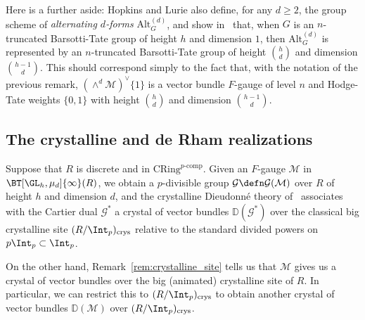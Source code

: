 \documentclass[10pt]{amsart}
\begin{document}
\begin{remark}
Here is a further aside: Hopkins and Lurie also define, for any $d\ge 2$, the group scheme of \emph{alternating $d$-forms} $\mathrm{Alt}^{(d)}_G$, and show in~\cite[Theorem 3.5.1]{lurie_hopkins} that, when $G$ is an $n$-truncated Barsotti-Tate group of height $h$ and dimension $1$, then $\mathrm{Alt}^{(d)}_G$ is represented by an $n$-truncated Barsotti-Tate group of height $\binom{h}{d}$ and dimension $\binom{h-1}{d}$. This should correspond simply to the fact that, with the notation of the previous remark, $(\wedge^d \mathcal{M})^\vee\{1\}$ is a vector bundle $F$-gauge of level $n$ and Hodge-Tate weights $\{0,1\}$ with height $\binom{h}{d}$ and dimension $\binom{h-1}{d}$.
\end{remark}   

\subsection{The crystalline and de Rham realizations}
\label{subsec:crystalline_comparison}

Suppose that $R$ is discrete and in $\mathrm{CRing}^{p\text{-comp}}$. Given an $F$-gauge $\mathcal{M}$ in $\BT[\GL_h,\mu_d]{\infty}(R)$, we obtain a $p$-divisible group $\mathcal{G}\defn \mathcal{G}(\mathcal{M})$ over $R$ of height $h$ and dimension $d$, and the crystalline Dieudonn\'e theory of~\cite{bbm:cris_ii} associates with the Cartier dual $\mathcal{G}^*$ a crystal of vector bundles $\mathbb{D}(\mathcal{G}^*)$ over the classical big crystalline site $(R/\Int_p)_{\mathrm{crys}}$ relative to the standard divided powers on $p\Int_p\subset\Int_p$. 

On the other hand, Remark~\ref{rem:crystalline_site} tells us that $\mathcal{M}$ gives us a crystal of vector bundles over the big (animated) crystalline site of $R$. In particular, we can restrict this to $(R/\Int_p)_{\mathrm{crys}}$ to obtain another crystal of vector bundles $\mathbb{D}(\mathcal{M})$ over $(R/\Int_p)_{\mathrm{crys}}$.
\end{document}
